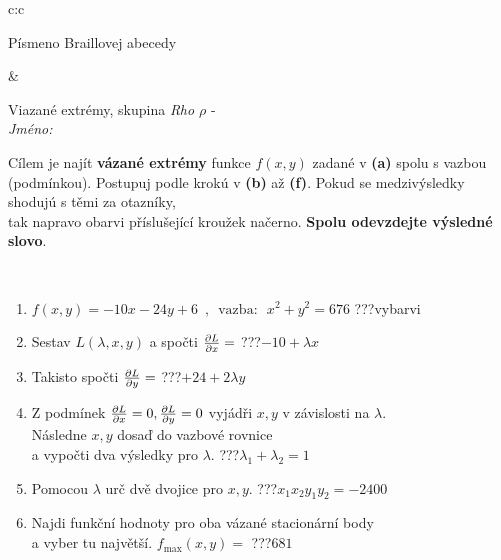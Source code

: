 \documentclass[10pt]{report}
\begin{document}
\begin{tabular}{c:c}
\begin{minipage}[c][104.5mm][t]{0.5\linewidth}
\begin{center}
\begin{minipage}{0.20\linewidth}
\begin{center}
{\small Písmeno Braillovej abecedy}
\end{center}
\end{minipage}
\end{center}
\end{minipage}
&
\begin{minipage}[c][104.5mm][t]{0.5\linewidth}
\begin{center}
\vspace{7mm}
{\huge Viazané extrémy, skupina \textit{Rho $\rho$} -}\\[5mm]
\textit{Jméno:}\phantom{xxxxxxxxxxxxxxxxxxxxxxxxxxxxxxxxxxxxxxxxxxxxxxxxxxxxxxxxxxxxxxxxx}\\[5mm]
\begin{minipage}{0.95\linewidth}
\begin{center}
Cílem je najít \textbf{vázané extrémy} funkce $f(x,y)$ zadané v \textbf{(a)} spolu s vazbou (podmínkou). Postupuj podle krokú v \textbf{(b)} až \textbf{(f)}. Pokud se medzivýsledky shodujú s těmi za otazníky,\\tak napravo obarvi příslušející kroužek načerno. \textbf{Spolu odevzdejte výsledné slovo}.
\end{center}
\end{minipage}
\\[1mm]
\begin{minipage}{0.79\linewidth}
\begin{center}
\begin{varwidth}{\linewidth}
\begin{enumerate}
\normalsize
\item $f(x,y)=-10x-24y+6 \enspace , \enspace \mathrm{vazba:} \enspace x^2+y^2=676$\quad \dotfill\; ???\;\dotfill \quad vybarvi
\item Sestav $L(\lambda,x,y)$ a spočti $\pdv{L}{x}=$\quad \dotfill\; ???\;\dotfill \quad $-10+\lambda x$
\item Takisto spočti $\pdv{L}{y}=$\quad \dotfill\; ???\;\dotfill \quad $+24+2\lambda y$
\item Z podmínek $\pdv{L}{x}=0 , \pdv{L}{y}=0$ vyjádři $x,y$ v závislosti na $\lambda$.\\ \phantom{xxxxxx}Následne $x,y$ dosaď do vazbové rovnice\\ \phantom{xxxxxx}a vypočti dva výsledky pro $\lambda$.\quad \dotfill\; ???\;\dotfill \quad $\lambda_1+\lambda_2=1$
\item Pomocou $\lambda$ urč dvě dvojice pro $x,y$.\quad \dotfill\; ???\;\dotfill \quad $x_1 x_2 y_1 y_2=-2400$
\item Najdi funkční hodnoty pro oba vázané stacionární body\\ \phantom{xxxxxx}a vyber tu najvětší. $f_{\text{max}}(x,y)=$\quad \dotfill\; ???\;\dotfill \quad $681$

\end{enumerate}
\end{varwidth}
\end{center}
\end{minipage}
\end{center}
\end{minipage}
\end{tabular}
\end{document}
